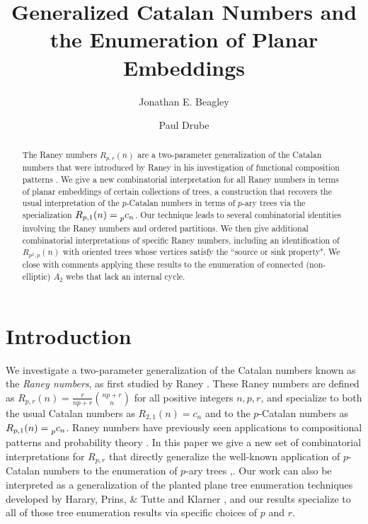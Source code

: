 \documentclass[documentfleqn,12pt]{amsart}
\begin{document}
\title[Generalized Catalan Numbers and the Enumeration of Planar Embeddings]{Generalized Catalan Numbers and the Enumeration of Planar Embeddings}

\author{Jonathan E. Beagley \and Paul Drube}

\address{Department of Mathematics and Computer Science\\ Valparaiso University, 1900 Chapel Drive, Valparaiso, IN 46383}



\begin{abstract}
The Raney numbers $R_{p,r}(n)$ are a two-parameter generalization of the Catalan numbers that were introduced by Raney in his investigation of functional composition patterns \cite{Raney}.  We give a new combinatorial interpretation for all Raney numbers in terms of planar embeddings of certain collections of trees, a construction that recovers the usual interpretation of the $p$-Catalan numbers in terms of $p$-ary trees via the specialization $R_{p,1}(n) = \prescript{}{p}c_n$.  Our technique leads to several combinatorial identities involving the Raney numbers and ordered partitions.  We then give additional combinatorial interpretations of specific Raney numbers, including an identification of $R_{p^2,p}(n)$ with oriented trees whose vertices satisfy the ``source or sink property".  We close with comments applying these results to the enumeration of connected (non-elliptic) $A_2$ webs that lack an internal cycle.
\end{abstract}

\maketitle


\section{Introduction}
\label{sec: intro}



We investigate a two-parameter generalization of the Catalan numbers known as the \emph{Raney numbers}, as first studied by Raney \cite{Raney}.  These Raney numbers are defined as $R_{p,r}(n) = \displaystyle\frac{r}{np+r}\binom{np+r}{n}$ for all positive integers $n,p,r$, and specialize to both the usual Catalan numbers as $R_{2,1}(n) = c_n$ and to the $p$-Catalan numbers as $R_{p,1}(n) = \prescript{}{p}c_n$.  Raney numbers have previously seen applications to compositional patterns \cite{Raney} and probability theory \cite{Mlot}.  In this paper we give a new set of combinatorial interpretations for $R_{p,r}$ that directly generalize the well-known application of $p$-Catalan numbers to the enumeration of $p$-ary trees \cite{HP},\cite{stanley}.  Our work can also be interpreted as a generalization of the planted plane tree enumeration techniques developed by Harary, Prins, \& Tutte \cite{HPT} and Klarner \cite{Klarner}, and our results specialize to all of those tree enumeration results via specific choices of $p$ and $r$.
\end{document}
